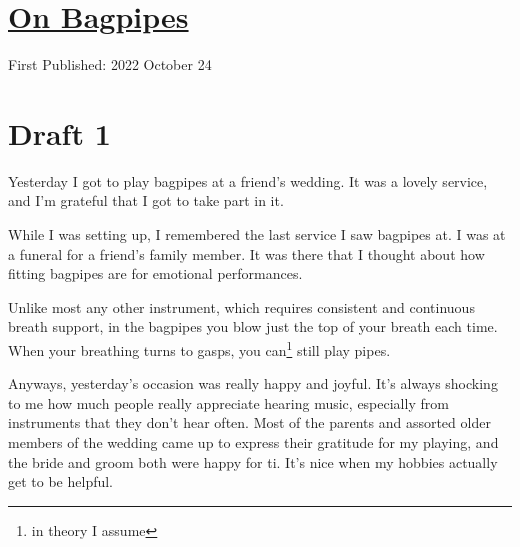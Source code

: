 \documentclass[12pt]{article}[titlepage]
\newcommand{\1}{\={a}}
\newcommand{\2}{\={e}}
\newcommand{\3}{\={\i}}
\newcommand{\4}{\=o}
\newcommand{\5}{\=u}
\newcommand{\6}{\={A}}
\renewcommand{\,}{\textsuperscript{,}}
\begin{document}
\doublespacing
\section{\href{bagpipes.tex}{On Bagpipes}}
First Published: 2022 October 24

\section{Draft 1}
Yesterday I got to play bagpipes at a friend's wedding.
It was a lovely service, and I'm grateful that I got to take part in it.

While I was setting up, I remembered the last service I saw bagpipes at.
I was at a funeral for a friend's family member.
It was there that I thought about how fitting bagpipes are for emotional performances.

Unlike most any other instrument, which requires consistent and continuous breath support, in the bagpipes you blow just the top of your breath each time.
When your breathing turns to gasps, you can\footnote{in theory I assume} still play pipes.

Anyways, yesterday's occasion was really happy and joyful.
It's always shocking to me how much people really appreciate hearing music, especially from instruments that they don't hear often.
Most of the parents and assorted older members of the wedding came up to express their gratitude for my playing, and the bride and groom both were happy for ti.
It's nice when my hobbies actually get to be helpful.
\end{document}
